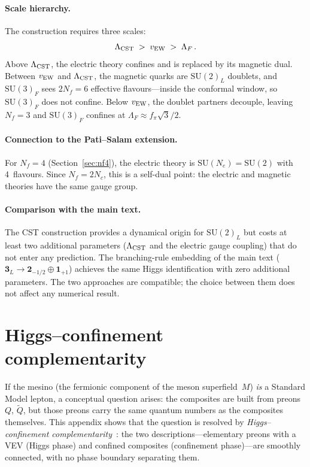 \documentclass[12pt,a4paper]{article}
\newcommand{\SU}{\mathrm{SU}}
\newcommand{\Nf}{N_f}
\newcommand{\Nc}{N_c}
\begin{document}
\paragraph{Scale hierarchy.}
The construction requires three scales:
\begin{equation}
  \Lambda_{\rm CST} \;>\; v_{\rm EW} \;>\; \Lambda_F\,.
  \label{eq:cst_scales}
\end{equation}
Above $\Lambda_{\rm CST}$, the electric theory confines
and is replaced by its magnetic dual.  Between $v_{\rm EW}$ and
$\Lambda_{\rm CST}$, the magnetic quarks are $\SU(2)_L$ doublets,
and $\SU(3)_F$ sees $2\Nf = 6$ effective flavours---inside the
conformal window, so $\SU(3)_F$ does not confine.  Below $v_{\rm EW}$,
the doublet partners decouple, leaving $\Nf = 3$ and $\SU(3)_F$
confines at $\Lambda_F \approx f_\pi\sqrt{3}/2$.

\paragraph{Connection to the Pati--Salam extension.}
For $\Nf = 4$ (Section~\ref{sec:nf4}), the electric theory is
$\SU(N_e) = \SU(2)$ with 4~flavours.  Since $\Nf = 2\Nc$, this is
a self-dual point: the electric and magnetic theories have the same
gauge group.

\paragraph{Comparison with the main text.}
The CST construction provides a dynamical origin for $\SU(2)_L$
but costs at least two additional parameters ($\Lambda_{\rm CST}$
and the electric gauge coupling) that do not enter any prediction.
The branching-rule embedding of the main text
($\mathbf{3}_L \to \mathbf{2}_{-1/2} \oplus \mathbf{1}_{+1}$)
achieves the same Higgs identification with zero additional
parameters.  The two approaches are compatible; the choice between
them does not affect any numerical result.


\section{Higgs--confinement complementarity}
\label{app:complementarity}

If the mesino (the fermionic component of the meson superfield~$M$)
\emph{is} a Standard Model lepton, a conceptual question arises:
the composites are built from preons~$Q$, $\tilde{Q}$, but those
preons carry the same quantum numbers as the composites themselves.
This appendix shows that the question is resolved by
\emph{Higgs--confinement complementarity}~\cite{FradkinShenker:1979,
OsterwalderSeiler:1978}: the two descriptions---elementary preons
with a VEV (Higgs phase) and confined composites (confinement
phase)---are smoothly connected, with no phase boundary separating
them.
\end{document}
